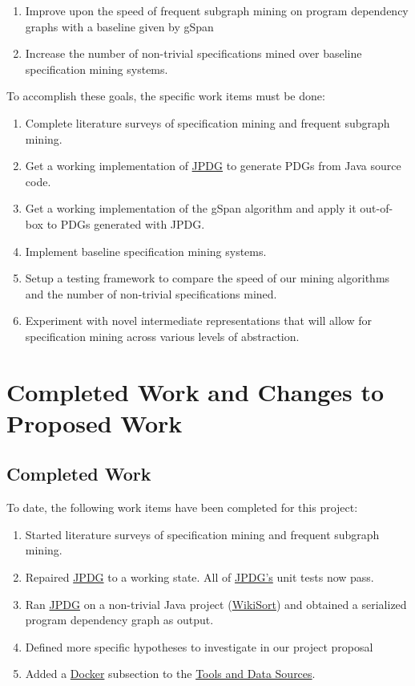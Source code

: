 \documentclass[12pt]{article}
\begin{document}
\begin{enumerate}
    \item Improve upon the speed of frequent subgraph mining on program dependency graphs with a baseline given by gSpan
    \item Increase the number of non-trivial specifications mined over baseline specification mining systems.
\end{enumerate}

\noindent To accomplish these goals, the specific work items must be done:

\begin{enumerate}
    \item Complete literature surveys of specification mining and frequent subgraph mining.
    \item Get a working implementation of \hyperref[subsection:JPDG]{JPDG} to generate PDGs from Java source code.
    \item Get a working implementation of the gSpan algorithm and apply it out-of-box to PDGs generated with JPDG.
    \item Implement baseline specification mining systems.
    \item Setup a testing framework to compare the speed of our mining algorithms and the number of non-trivial specifications mined.
    \item Experiment with novel intermediate representations that will allow for specification mining across various levels of abstraction.
\end{enumerate}

\section{Completed Work and Changes to Proposed Work}

\subsection{Completed Work}
To date, the following work items have been completed for this project:

\begin{enumerate}
    \item Started literature surveys of specification mining and frequent subgraph mining.
    \item Repaired \hyperref[subsection:JPDG]{JPDG} to a working state. All of \hyperref[subsection:JPDG]{JPDG's} unit tests now pass.
    \item Ran \hyperref[subsection:JPDG]{JPDG} on a non-trivial Java project (\href{https://github.com/BonzaiThePenguin/WikiSort}{WikiSort}) and obtained a serialized program dependency graph as output.
    \item Defined more specific hypotheses to investigate in our project proposal
    \item Added a \hyperref[subsection:Docker]{Docker} subsection to the \hyperref[section:Tools and Data Sources]{Tools and Data Sources}.
\end{enumerate}
\end{document}
